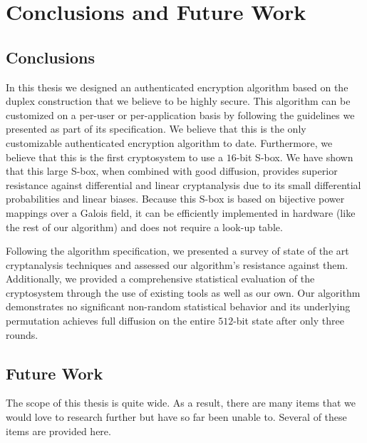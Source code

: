 \chapter{Conclusions and Future Work}
\label{ch:Conclusions}

\section{Conclusions}
In this thesis we designed an authenticated encryption algorithm based on the duplex construction that we believe to be highly secure.
This algorithm can be customized on a per-user or per-application basis by following the guidelines we presented as part of its specification.
We believe that this is the only customizable authenticated encryption algorithm to date.
Furthermore, we believe that this is the first cryptosystem to use a $16$-bit S-box.
We have shown that this large S-box, when combined with good diffusion, provides superior resistance against differential and linear cryptanalysis due to its small differential probabilities and linear biases.
Because this S-box is based on bijective power mappings over a Galois field, it can be efficiently implemented in hardware (like the rest of our algorithm) and does not require a look-up table.

Following the algorithm specification, we presented a survey of state of the art cryptanalysis techniques and assessed our algorithm's resistance against them.
Additionally, we provided a comprehensive statistical evaluation of the cryptosystem through the use of existing tools as well as our own.
Our algorithm demonstrates no significant non-random statistical behavior and its underlying permutation achieves full diffusion on the entire $512$-bit state after only three rounds.

\section{Future Work}
The scope of this thesis is quite wide.
As a result, there are many items that we would love to research further but have so far been unable to.
Several of these items are provided here.

